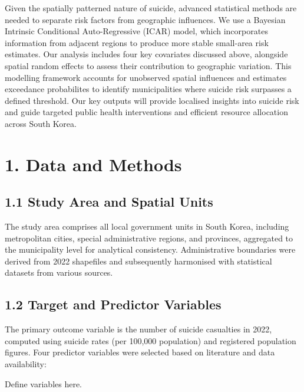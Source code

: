 \documentclass[11pt]{article}
\begin{document}
	Given the spatially patterned nature of suicide, advanced statistical methods are needed to separate risk factors from geographic influences. We use a Bayesian Intrinsic Conditional Auto-Regressive (ICAR) model, which incorporates information from adjacent regions to produce more stable small-area risk estimates. Our analysis includes four key covariates discussed above, alongside spatial random effects to assess their contribution to geographic variation. This modelling framework accounts for unobserved spatial influences and estimates exceedance probabilites to identify municipalities where suicide risk surpasses a defined threshold. Our key outputs will provide localised insights into suicide risk and guide targeted public health interventions and efficient resource allocation across South Korea.

	\section*{1. Data and Methods}
	
	\subsection*{1.1 Study Area and Spatial Units}
	
	The study area comprises all local government units in South Korea, including metropolitan cities, special administrative regions, and provinces, aggregated to the municipality level for analytical consistency. Administrative boundaries were derived from 2022 shapefiles and subsequently harmonised with statistical datasets from various sources.
	
	\subsection*{1.2 Target and Predictor Variables}
	
	The primary outcome variable is the number of suicide casualties in 2022, computed using suicide rates (per 100,000 population) and registered population figures. Four predictor variables were selected based on literature and data availability:
	
	Define variables here.
	
\end{document}
